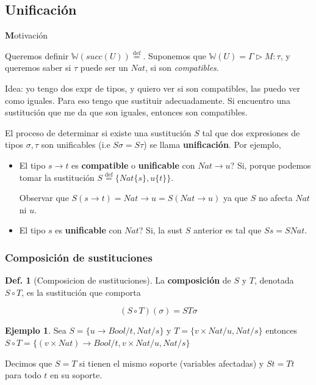 \documentclass{report}
\theoremstyle{definition} %
\newtheorem{definition}{Def.}[chapter]
\newtheorem{example}{Ejemplo}[chapter]
\newenvironment{nota}[1]
    {\begin{leftbar}\textbf{#1}}
    {\end{leftbar}}
\newcommand{\eqdef}{\overset{\text{def}}{=}}
\newcommand{\tfunc}[2]{#1 \to #2}
\newcommand{\sust}[2]{#1 \{ #2 \}}
\newcommand{\tipa}[3]{#1 \rhd #2 : #3} %
\newcommand{\Gtipa}[2]{\tipa{\Gamma}{#1}{#2}}
\newcommand{\suc}[1]{succ(#1)}
\newcommand{\tsust}[1]{S#1} %
\newcommand{\sustfor}[2]{#1/#2} %
\newcommand{\infer}[1]{\mathbb{W}(#1)}
\newcommand{\comp}[2]{#1 \circ #2}
\begin{document}
\subsection{Unificación}

\begin{nota}
    Motivación

    Queremos definir $\infer{\suc{U}} \eqdef$. Suponemos que $\infer{U} =
    \Gtipa{M}{\tau}$, y queremos saber si $\tau$ puede ser un $Nat$, si son
    \textit{compatibles}.
    
    Idea: yo tengo dos expr de tipos, y quiero ver si son compatibles, las puedo
    ver como iguales. Para eso tengo que sustituir adecuadamente. Si encuentro
    una sustitución que me da que son iguales, entonces son compatibles.
\end{nota}

El proceso de determinar si existe una sustitución $S$ tal que dos expresiones
de tipos $\sigma, \tau$ son unificables (i.e $\tsust{\sigma} =
\tsust{\tau}$) se llama \textbf{unificación}. Por ejemplo,

\begin{itemize}
    \item El tipo $\tfunc{s}{t}$ es \textbf{compatible} o \textbf{unificable}
    con $\tfunc{Nat}{u}$? Si, porque podemos tomar la sustitución $S \eqdef \{
    \sust{Nat}{s}, \sust{u}{t} \}$.

    Observar que
    \(
        \tsust{(\tfunc{s}{t})}
        = \tfunc{Nat}{u}
        = \tsust{(\tfunc{Nat}{u})}
    \)
    ya que $S$ no afecta $Nat$ ni $u$.

    \item El tipo $s$ es \textbf{unificable} con $Nat$? Si, la sust $S$ anterior
    es tal que $\tsust{s} = \tsust{Nat}$.
\end{itemize}

\subsubsection{Composición de sustituciones}

\begin{definition}[Composicion de sustituciones]
    La \textbf{composición} de $S$ y $T$, denotada $\comp{S}{T}$, es la sustitución que
    comporta

    \[
        (\comp{S}{T})(\sigma) = \tsust{T \sigma}
    \]

    \begin{example}
        Sea $S = \{ \sustfor{\tfunc{u}{Bool}}{t}, \sustfor{Nat}{s} \}$ y $T = \{
        \sustfor{v \times Nat}{u}, \sustfor{Nat}{s} \}$ entonces $\comp{S}{T} =
        \{ \sustfor{\tfunc{(v \times Nat)}{Bool}}{t}, \sustfor{v \times Nat}{u},
            \sustfor{Nat}{s}
        \}$
    \end{example}

    Decimos que $S = T$ si tienen el mismo soporte (variables afectadas) y $St =
    Tt$ para todo $t$ en su soporte.
\end{definition}
\end{document}
